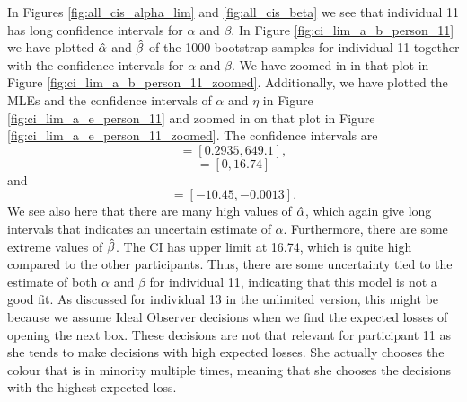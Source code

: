 In Figures \ref{fig:all_cis_alpha_lim} and \ref{fig:all_cis_beta} we see that individual 11 has long confidence intervals for $\alpha$ and $\beta$. In Figure \ref{fig:ci_lim_a_b_person_11} we have plotted $\hat{\alpha}$ and $\hat{\beta}$ of the 1000 bootstrap samples for individual 11 together with the confidence intervals for $\alpha$ and $\beta$.
We have zoomed in in that plot in Figure \ref{fig:ci_lim_a_b_person_11_zoomed}. Additionally, we have plotted the MLEs and the confidence intervals of $\alpha$ and $\eta$ in Figure \ref{fig:ci_lim_a_e_person_11} and zoomed in on that plot in Figure \ref{fig:ci_lim_a_e_person_11_zoomed}.
The confidence intervals are 
\begin{equation*}
    [\hat{\alpha}^{*(5)}_{1000},\hat{\alpha}^{*(95)}_{1000}] = [0.2935,649.1],
\end{equation*}
\begin{equation*}
    [\hb^{*(5)}_{1000},\hb^{*(95)}_{1000}] = [0,16.74]
\end{equation*}
and
\begin{equation*}
    [\hat{\eta}^{*(5)}_{1000},\hat{\eta}^{*(95)}_{1000}] = [-10.45,-0.0013].
\end{equation*}
We see also here that there are many high values of $\hat{\alpha}$, which again give long intervals that indicates an uncertain estimate of $\alpha$. Furthermore, there are some extreme values of $\hat{\beta}$. The CI has upper limit at 16.74, which is quite high compared to the other participants. Thus, there are some uncertainty tied to the estimate of both $\alpha$ and $\beta$ for individual 11, indicating that this model is not a good fit. As discussed for individual 13 in the unlimited version, this might be because we assume Ideal Observer decisions when we find the expected losses of opening the next box. These decisions are not that relevant for participant 11 as she tends to make decisions with high expected losses. She actually chooses the colour that is in minority multiple times, meaning that she chooses the decisions with the highest expected loss. 
